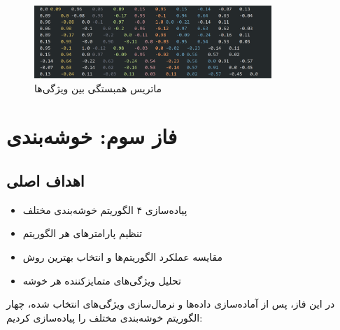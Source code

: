 \documentclass[a4paper,12pt]{article}
\let\nobreaksection\section
\renewcommand{\section}{\nobreaksection}
\begin{document}
\begin{figure}[h]
\centering
\includegraphics[width=0.8\textwidth]{correlation_matrix.png}
\caption{ماتریس همبستگی بین ویژگی‌ها}
\end{figure}


\section{فاز سوم: خوشه‌بندی}

\subsection*{\textbf{اهداف اصلی}}
\begin{itemize}
	\item پیاده‌سازی ۴ الگوریتم خوشه‌بندی مختلف
	\item تنظیم پارامترهای هر الگوریتم
	\item مقایسه عملکرد الگوریتم‌ها و انتخاب بهترین روش
	\item تحلیل ویژگی‌های متمایزکننده هر خوشه
\end{itemize}
در این فاز، پس از آماده‌سازی داده‌ها و نرمال‌سازی ویژگی‌های انتخاب شده، چهار الگوریتم خوشه‌بندی مختلف را پیاده‌سازی کردیم:
\end{document}
